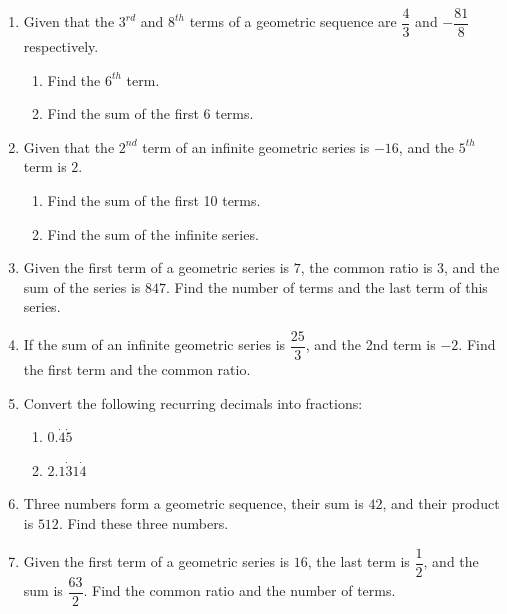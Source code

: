 \documentclass{report}
\begin{document}
        \begin{enumerate}
            \item Given that the $3^{rd}$ and $8^{th}$ terms of a geometric sequence are $\dfrac{4}{3}$ and $-\dfrac{81}{8}$ respectively.
            \begin{enumerate}
                \item Find the $6^{th}$ term.
                \item Find the sum of the first $6$ terms.
            \end{enumerate}

            \item Given that the $2^{nd}$ term of an infinite geometric series is $-16$, and the $5^{th}$ term is $2$.
            \begin{enumerate}
                \item Find the sum of the first 10 terms.
                \item Find the sum of the infinite series.
            \end{enumerate}

            \item Given the first term of a geometric series is $7$, the common ratio is $3$, and the sum of the series is $847$. Find the number of terms and the last term of this series.

            \item If the sum of an infinite geometric series is $\dfrac{25}{3}$, and the 2nd term is $-2$. Find the first term and the common ratio.

            \item Convert the following recurring decimals into fractions:
            \begin{enumerate}
                \item $0.\dot{4}\dot{5}$
                \item $2.1\dot{3}1\dot{4}$
            \end{enumerate}

            \item Three numbers form a geometric sequence, their sum is $42$, and their product is $512$. Find these three numbers.

            \item Given the first term of a geometric series is $16$, the last term is $\dfrac{1}{2}$, and the sum is $\dfrac{63}{2}$. Find the common ratio and the number of terms.


\end{enumerate}
\end{document}

